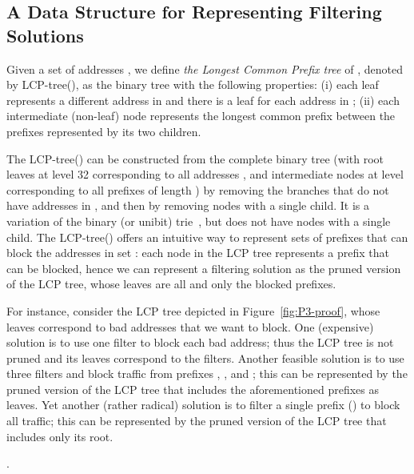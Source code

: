 \subsection{A Data Structure for Representing Filtering Solutions}

\begin{definition}
Given a set of addresses , we define {\em the Longest Common Prefix tree} of , denoted by LCP-tree(),
as the binary tree with the following properties:
(i) each leaf represents a different address in  and there is a leaf for each address in ;
(ii) each intermediate (non-leaf) node represents the longest common prefix between the prefixes represented by its two children.
\end{definition}

The LCP-tree() can be constructed from the complete binary tree (with root  leaves at level 32 corresponding to all addresses , and intermediate nodes at level  corresponding to all prefixes of length ) by removing the branches that do not have addresses in , and then by removing nodes with a single child.
It is a variation of the binary (or unibit) trie~\cite{varghese}, but does not have nodes with a single child.
The LCP-tree() offers an intuitive way to represent sets of prefixes that can block the addresses in set : each node in the LCP tree represents a prefix that can be blocked, hence we can represent a filtering solution as the pruned version of the LCP tree, whose leaves are all and only the blocked prefixes.

\begin{example}
For instance, consider the LCP tree depicted in Figure~\ref{fig:P3-proof}, whose leaves correspond to bad addresses that we want to block. One (expensive) solution is to use one filter to block each bad address; thus the LCP tree is not pruned and its leaves correspond to the filters. Another feasible solution is to use three filters and block traffic from prefixes , , and ; this can be represented
by the pruned version of the LCP tree that includes the
aforementioned prefixes as leaves. Yet another (rather radical) solution is to filter a single prefix () to  block all traffic; this can be represented by the pruned version of the LCP tree that includes only its root.
\end{example}.



